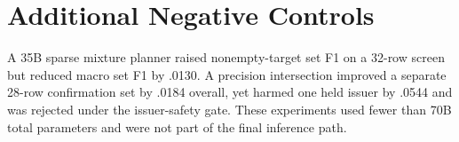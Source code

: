 \documentclass[11pt]{article}
\begin{document}
\section{Additional Negative Controls}
A 35B sparse mixture planner raised nonempty-target set F1 on a 32-row screen but reduced macro set F1 by .0130. A precision intersection improved a separate 28-row confirmation set by .0184 overall, yet harmed one held issuer by .0544 and was rejected under the issuer-safety gate. These experiments used fewer than 70B total parameters and were not part of the final inference path.
\end{document}
